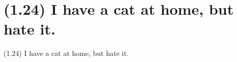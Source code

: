 \documentclass{article}
\begin{document}
\clearpage

%
%

\section*{(1.24) I have a cat at home, but hate it.}

\bigbreak
\begin{enumerate*}
\item[(1.24)] I have a cat at home, but hate it.
\end{enumerate*}
\bigbreak
\end{document}
